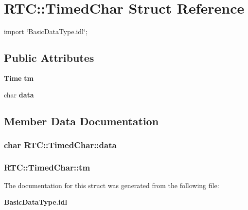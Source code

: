 \section{RTC::TimedChar Struct Reference}
\label{structRTC_1_1TimedChar}


{\ttfamily import \char`\"{}BasicDataType.idl\char`\"{};}

\subsection*{Public Attributes}
\begin{DoxyCompactItemize}
\item 
{\bf Time} {\bf tm}
\item 
char {\bf data}
\end{DoxyCompactItemize}


\subsection{Member Data Documentation}
\subsubsection[{data}]{\setlength{\rightskip}{0pt plus 5cm}char {\bf RTC::TimedChar::data}}\label{structRTC_1_1TimedChar_a448dbbc6aa602a9314da5ce19a49dd59}
\subsubsection[{tm}]{ {\bf RTC::TimedChar::tm}}\label{structRTC_1_1TimedChar_a7c25b6d06dc64102f94a400d6a5b4e0e}


The documentation for this struct was generated from the following file:\begin{DoxyCompactItemize}
\item 
{\bf BasicDataType.idl}\end{DoxyCompactItemize}
